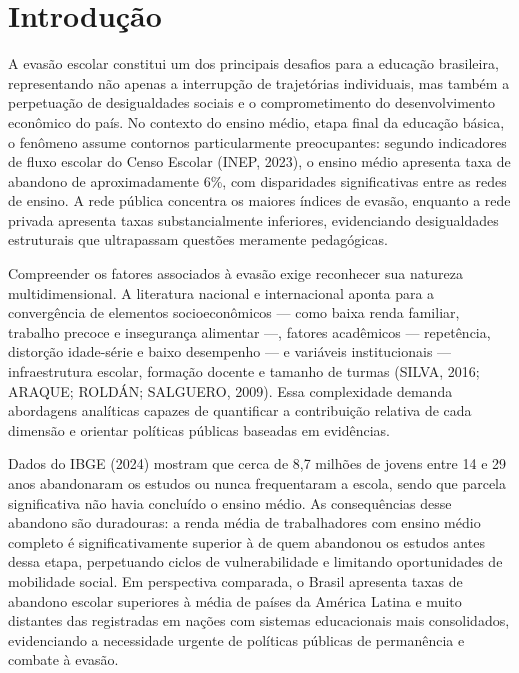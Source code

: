 \documentclass[english, spanish, brazilian]{RBIEarticle} %
\begin{document}
\pagebreak


\section{Introdução}

A evasão escolar constitui um dos principais desafios para a educação brasileira, representando não apenas a interrupção de trajetórias individuais, mas também a perpetuação de desigualdades sociais e o comprometimento do desenvolvimento econômico do país. No contexto do ensino médio, etapa final da educação básica, o fenômeno assume contornos particularmente preocupantes: segundo indicadores de fluxo escolar do Censo Escolar (INEP, 2023), o ensino médio apresenta taxa de abandono de aproximadamente 6\%, com disparidades significativas entre as redes de ensino. A rede pública concentra os maiores índices de evasão, enquanto a rede privada apresenta taxas substancialmente inferiores, evidenciando desigualdades estruturais que ultrapassam questões meramente pedagógicas.

Compreender os fatores associados à evasão exige reconhecer sua natureza multidimensional. A literatura nacional e internacional aponta para a convergência de elementos socioeconômicos — como baixa renda familiar, trabalho precoce e insegurança alimentar —, fatores acadêmicos — repetência, distorção idade-série e baixo desempenho — e variáveis institucionais — infraestrutura escolar, formação docente e tamanho de turmas (SILVA, 2016; ARAQUE; ROLDÁN; SALGUERO, 2009). Essa complexidade demanda abordagens analíticas capazes de quantificar a contribuição relativa de cada dimensão e orientar políticas públicas baseadas em evidências.

Dados do IBGE (2024) mostram que cerca de 8,7 milhões de jovens entre 14 e 29 anos abandonaram os estudos ou nunca frequentaram a escola, sendo que parcela significativa não havia concluído o ensino médio. As consequências desse abandono são duradouras: a renda média de trabalhadores com ensino médio completo é significativamente superior à de quem abandonou os estudos antes dessa etapa, perpetuando ciclos de vulnerabilidade e limitando oportunidades de mobilidade social. Em perspectiva comparada, o Brasil apresenta taxas de abandono escolar superiores à média de países da América Latina e muito distantes das registradas em nações com sistemas educacionais mais consolidados, evidenciando a necessidade urgente de políticas públicas de permanência e combate à evasão.
\end{document}
